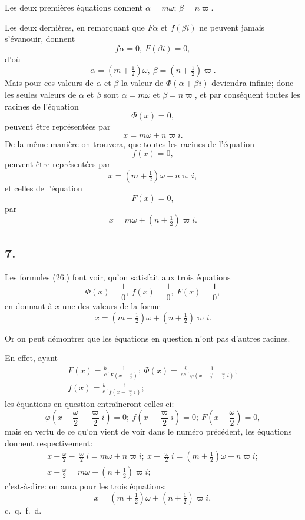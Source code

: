 \documentclass{article}
\begin{document}
Les deux premières équations donnent $\alpha=m\omega$; $\beta=n\varpi$.

Les deux dernières, en remarquant que $F\alpha$ et $f(\beta i)$ ne peuvent jamais s'évanouir, donnent
\[ f\alpha=0,\ F(\beta i)=0, \]
d'où
\[ \alpha=(m+\tfrac{1}{2})\omega,\ \beta=(n+\tfrac{1}{2})\varpi. \]
Mais pour ces valeurs de $\alpha$ et $\beta$ la valeur de $\Phi(\alpha+\beta i)$ deviendra infinie; donc les seules valeurs de $\alpha$ et $\beta$ sont $\alpha=m\omega$ et $\beta=n\varpi$, et par conséquent toutes les racines de l'équation
\[ \Phi(x)=0, \]
peuvent être représentées par
\[ x=m\omega+n\varpi i. \tag{27.} \]
De la même manière on trouvera, que toutes les racines de l'équation
\[ f(x)=0, \]
peuvent être représentées par
\[ x=(m+\tfrac{1}{2})\omega+n\varpi i, \tag{28.} \]
et celles de l'équation
\[ F(x)=0, \]
par
\[ x=m\omega+(n+\tfrac{1}{2})\varpi i. \tag{29.} \]


\subsection*{7.}

Les formules (26.) font voir, qu'on satisfait aux trois équations
\[ \Phi(x)=\frac{1}{0},\ f(x)=\frac{1}{0},\ F(x)=\frac{1}{0}, \]
en donnant à $x$ une des valeurs de la forme
\[ x=(m+\tfrac{1}{2})\omega+(n+\tfrac{1}{2})\varpi i. \tag{30.} \]

Or on peut démontrer que les équations en question n'ont pas d'autres racines.

En effet, ayant
\[ \begin{gathered} F(x)=\frac{b}{c}.\frac{1}{F\left(x-\frac{\omega}{2}\right)};\ \Phi(x)=\frac{-i}{ec}.\frac{1}{\varphi\left(x-\frac{\omega}{2}-\frac{\varpi}{2}i\right)};\\ f(x)=\frac{b}{e}.\frac{1}{f\left(x-\frac{\varpi}{2}i\right)}; \end{gathered} \]
les équations en question entraîneront celles-ci:
\[ \varphi\left(x-\frac{\omega}{2}-\frac{\varpi}{2}i\right)=0;\ f\left(x-\frac{\varpi}{2}i\right)=0;\ F\left(x-\frac{\omega}{2}\right)=0, \]
mais en vertu de ce qu'on vient de voir dans le numéro précédent, les équations donnent respectivement:
\[ \begin{gathered} x-\frac{\omega}{2}-\frac{\varpi}{2}i=m\omega+n\varpi i;\ x-\frac{\varpi}{2}i=(m+\tfrac{1}{2})\omega+n\varpi i;\\ x-\frac{\omega}{2}=m\omega+(n+\tfrac{1}{2})\varpi i; \end{gathered} \]
c'est-à-dire: on aura pour les trois équations:
\[ x=(m+\tfrac{1}{2})\omega+(n+\tfrac{1}{2})\varpi i, \]
c.\ q.\ f.\ d.
\end{document}
